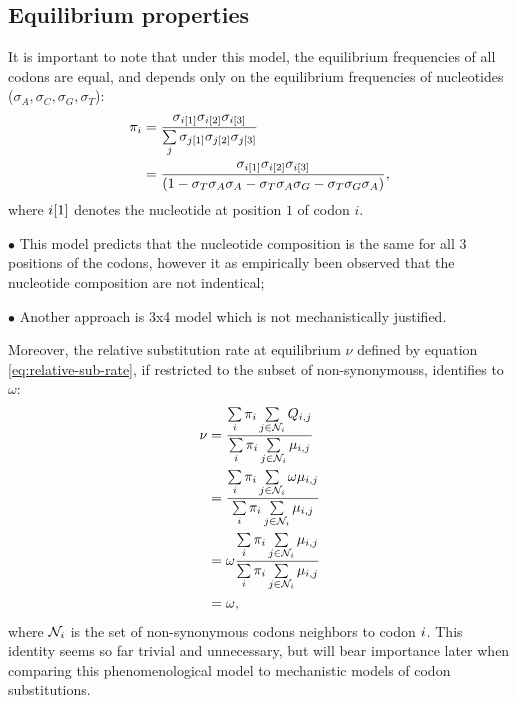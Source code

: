 \subsection{Equilibrium properties}

It is important to note that under this model, the equilibrium frequencies of all \glspl{codon} are equal, and depends only on the equilibrium frequencies of nucleotides ($\sigma_{A}, \sigma_{C}, \sigma_{G}, \sigma_{T}$):
\begin{align}
    \pi_{{i}} & = \dfrac{\sigma_{{i}[1]}\sigma_{{i}[2]}\sigma_{{i}[3]}}{\sum\limits_{{j}}\sigma_{{j}[1]}\sigma_{{j}[2]}\sigma_{{j}[3]} } \\
    & = \dfrac{\sigma_{{i}[1]}\sigma_{{i}[2]}\sigma_{{i}[3]}}{(1 - \sigma_{T}\sigma_{A}\sigma_{A} - \sigma_{T}\sigma_{A}\sigma_{G} - \sigma_{T}\sigma_{G}\sigma_{A} )},
\end{align}
where ${i}[1]$ denotes the nucleotide at position $1$ of \gls{codon} $i$.

$\bullet$ This model predicts that the nucleotide composition is the same for all $3$ positions of the codons, however it as empirically been observed that the nucleotide composition are not indentical;

$\bullet$ Another approach is 3x4 model which is not mechanistically justified.

Moreover, the relative \gls{substitution} rate at equilibrium $\nu$ defined by equation \ref{eq:relative-sub-rate}, if restricted to the subset of \glspl{non-synonymous}, identifies to $\omega$:
\begin{align}
    \nu & = \dfrac{ \sum\limits_{{i}} \pi_{{i}} \sum\limits_{{j} \in \mathcal{N}_{{i}}} Q_{{i}, {j}}}{\sum\limits_{{i}} \pi_{{i}} \sum\limits_{{j} \in \mathcal{N}_{{i}}} \mu_{{i}, {j}}} \\
    & = \dfrac{ \sum\limits_{{i}} \pi_{{i}} \sum\limits_{{j} \in \mathcal{N}_{{i}}} \omega \mu_{{i}, {j}}}{\sum\limits_{{i}} \pi_{{i}} \sum\limits_{{j} \in \mathcal{N}_{{i}}} \mu_{{i}, {j}}} \\
    & = \omega \dfrac{ \sum\limits_{{i}} \pi_{{i}} \sum\limits_{{j} \in \mathcal{N}_{{i}}} \mu_{{i}, {j}}}{\sum\limits_{{i}} \pi_{{i}} \sum\limits_{{j} \in \mathcal{N}_{{i}}} \mu_{{i}, {j}}} \\
    & = \omega,
\end{align}
where $\mathcal{N}_{{i}}$ is the set of non-synonymous \glspl{codon} neighbors to \gls{codon} ${i}$.
This identity seems so far trivial and unnecessary, but will bear importance later when comparing this phenomenological model to mechanistic models of \gls{codon} \glspl{substitution}.

